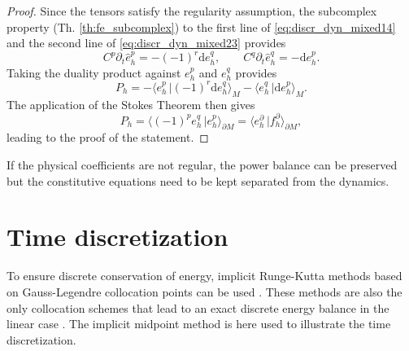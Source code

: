 \documentclass{elsarticle}
\renewcommand\d{\ensuremath{\mathrm{d}}}
\newcommand*{\dual}[1]{\ensuremath{\widehat{#1}}}
\newcommand{\dualpr}[3][]{\ensuremath{\langle #2 \, \vert #3 \rangle_{#1}}}
\begin{document}
\begin{proof}
Since the tensors satisfy the regularity assumption, the subcomplex property (Th. \ref{th:fe_subcomplex}) to the first line of \eqref{eq:discr_dyn_mixed14} and the second line of \eqref{eq:discr_dyn_mixed23} provides
\begin{equation*}
C^p\partial_t\dual{e}^p_h = -(-1)^r\d e^q_h, \qquad C^q\partial_t\dual{e}^q_h = -\d e^p_h.
\end{equation*}
Taking the duality product against $e^p_h$ and $e_h^q$ provides
\begin{equation*}
P_h= -\dualpr[M]{e^p_h}{(-1)^r\d e^q_h}-\dualpr[M]{e_h^q}{\d e^p_h}.
\end{equation*}
The application of the Stokes Theorem then gives
\begin{equation*}
P_h = \dualpr[\partial M]{(-1)^p e^q_h}{e^p_h}= \dualpr[\partial M]{e^\partial_h}{f^\partial_h},
\end{equation*}
leading to the proof of the statement.
\end{proof}

If the physical coefficients are not regular, the power balance can be preserved but the constitutive equations need to be kept separated from the dynamics. 


\section{Time discretization}\label{sec:time_discr}

To ensure discrete conservation of energy, implicit Runge-Kutta methods based on Gauss-Legendre collocation points can be used \cite{sanzserna1992}. These methods are also the only collocation schemes that lead to an exact discrete energy balance in the linear case \cite{kotyczka2019discrete}. The implicit midpoint method is here used to illustrate the time discretization. \\
\end{document}
